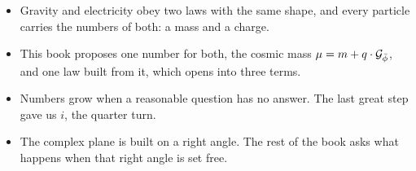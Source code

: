

\begin{plainwords}
\begin{itemize}
  \item Gravity and electricity obey two laws with the same shape, and every particle carries the numbers of both: a mass and a charge.
  \item This book proposes one number for both, the cosmic mass $\mu = m + q \cdot \mathcal{G}_{\bar{\phi}}$, and one law built from it, which opens into three terms.
  \item Numbers grow when a reasonable question has no answer. The last great step gave us $i$, the quarter turn.
  \item The complex plane is built on a right angle. The rest of the book asks what happens when that right angle is set free.
\end{itemize}
\end{plainwords}
